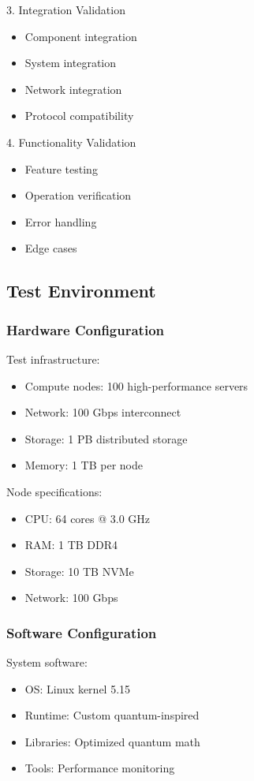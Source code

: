 \documentclass[12pt]{article}
\begin{document}
3. Integration Validation
\begin{itemize}
\item Component integration
\item System integration
\item Network integration
\item Protocol compatibility
\end{itemize}

4. Functionality Validation
\begin{itemize}
\item Feature testing
\item Operation verification
\item Error handling
\item Edge cases
\end{itemize}

\subsection{Test Environment}

\subsubsection{Hardware Configuration}

Test infrastructure:
\begin{itemize}
\item Compute nodes: 100 high-performance servers
\item Network: 100 Gbps interconnect
\item Storage: 1 PB distributed storage
\item Memory: 1 TB per node
\end{itemize}

Node specifications:
\begin{itemize}
\item CPU: 64 cores @ 3.0 GHz
\item RAM: 1 TB DDR4
\item Storage: 10 TB NVMe
\item Network: 100 Gbps
\end{itemize}

\subsubsection{Software Configuration}

System software:
\begin{itemize}
\item OS: Linux kernel 5.15
\item Runtime: Custom quantum-inspired
\item Libraries: Optimized quantum math
\item Tools: Performance monitoring
\end{itemize}
\end{document}
